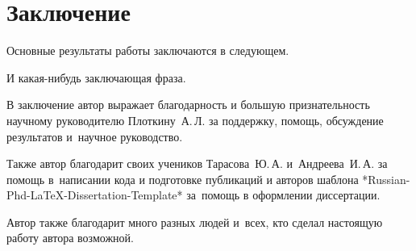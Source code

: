 \chapter*{Заключение}                       %


Основные результаты работы заключаются в следующем.

И какая-нибудь заключающая фраза.

В заключение автор выражает благодарность и большую признательность научному руководителю Плоткину~А.\,Л. за поддержку, помощь, обсуждение результатов и~научное руководство.

Также автор благодарит своих учеников Тарасова~Ю.\,А. и~Андреева~И.\,А. за помощь в~написании кода и подготовке публикаций и авторов шаблона *Russian-Phd-LaTeX-Dissertation-Template* за~помощь в оформлении диссертации.

Автор также благодарит много разных людей и~всех, кто сделал настоящую работу автора возможной.